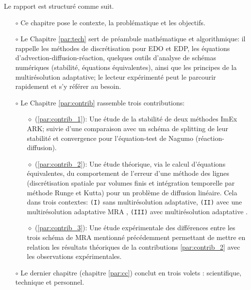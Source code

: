 Le rapport est structuré comme suit.
\begin{itemize}
\item[$\circ$] Ce chapitre pose le contexte, la problématique et les objectifs.
\item[$\circ$] Le Chapitre \ref{par:tech} sert de préambule mathématique et algorithmique:
il rappelle les méthodes de discrétisation pour EDO et EDP, les équations d'advection-diffusion-réaction, 
quelques outils d'analyse de schémas numériques (stabilité, équations équivalentes), ainsi que les principes de la multirésolution adaptative; 
le lecteur expérimenté peut le parcourir rapidement et s'y référer au besoin.
\item[$\circ$] Le Chapitre \ref{par:contrib} rassemble trois contributions:
\begin{itemize}
    \item[$\diamond$] (\ref{par:contrib_1}): Une étude de la stabilité de deux méthodes ImEx ARK;
    suivie d'une comparaison avec un schéma de splitting de leur stabilité et convergence pour l'équation-test de Nagumo (réaction-diffusion).
    \item[$\diamond$] (\ref{par:contrib_2}): Une étude théorique, via le calcul d'équations équivalentes, 
    du comportement de l'erreur d'une méthode des lignes (discrétisation spatiale par volumes finis et intégration temporelle par méthode Runge et Kutta) pour un problème de diffusion linéaire.
    Cela dans trois contextes: 
    \texttt{(I)} sans multirésolution adaptative, 
    \texttt{(II)} avec une multirésolution adaptative MRA ,
    \texttt{(III)} avec multirésolution adaptative .
    \item[$\diamond$] (\ref{par:contrib_3}): Une étude expérimentale des différences entre les trois schéma de MRA mentionné précédemment 
    permettant de mettre en relation les résultats théoriques de la contributions \ref{par:contrib_2} avec les observations expérimentales.
\end{itemize}
\item[$\circ$] Le dernier chapitre (chapitre \ref{par:cc}) conclut en trois volets : scientifique, technique et personnel.
\end{itemize}